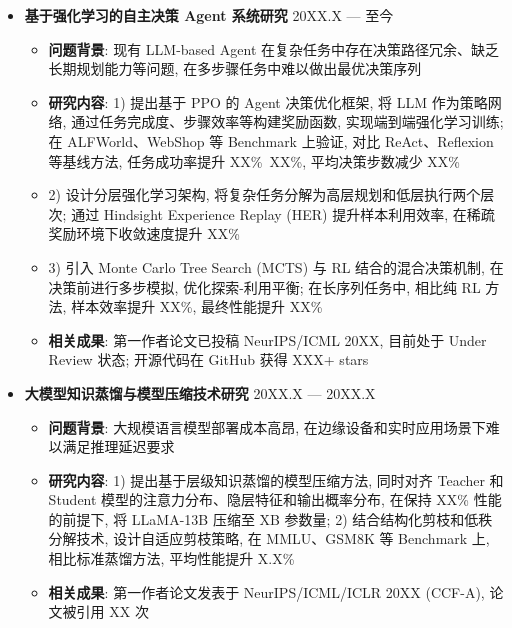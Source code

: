 \documentclass[zh]{resume}
\begin{document}
\begin{itemize}
    \item \textbf{基于强化学习的自主决策 Agent 系统研究} \hfill 20XX.X --- 至今
    \begin{itemize}
        \item \textbf{问题背景}: 现有 LLM-based Agent 在复杂任务中存在决策路径冗余、缺乏长期规划能力等问题, 在多步骤任务中难以做出最优决策序列
        \item \textbf{研究内容}: 1) 提出基于 PPO 的 Agent 决策优化框架, 将 LLM 作为策略网络, 通过任务完成度、步骤效率等构建奖励函数, 实现端到端强化学习训练; 在 ALFWorld、WebShop 等 Benchmark 上验证, 对比 ReAct、Reflexion 等基线方法, 任务成功率提升 XX\%~XX\%, 平均决策步数减少 XX\%
        \item 2) 设计分层强化学习架构, 将复杂任务分解为高层规划和低层执行两个层次; 通过 Hindsight Experience Replay (HER) 提升样本利用效率, 在稀疏奖励环境下收敛速度提升 XX\%
        \item 3) 引入 Monte Carlo Tree Search (MCTS) 与 RL 结合的混合决策机制, 在决策前进行多步模拟, 优化探索-利用平衡; 在长序列任务中, 相比纯 RL 方法, 样本效率提升 XX\%, 最终性能提升 XX\%
        \item \textbf{相关成果}: 第一作者论文已投稿 NeurIPS/ICML 20XX, 目前处于 Under Review 状态; 开源代码在 GitHub 获得 XXX+ stars
    \end{itemize}
    
    \item \textbf{大模型知识蒸馏与模型压缩技术研究} \hfill 20XX.X --- 20XX.X
    \begin{itemize}
        \item \textbf{问题背景}: 大规模语言模型部署成本高昂, 在边缘设备和实时应用场景下难以满足推理延迟要求
        \item \textbf{研究内容}: 1) 提出基于层级知识蒸馏的模型压缩方法, 同时对齐 Teacher 和 Student 模型的注意力分布、隐层特征和输出概率分布, 在保持 XX\% 性能的前提下, 将 LLaMA-13B 压缩至 XB 参数量; 2) 结合结构化剪枝和低秩分解技术, 设计自适应剪枝策略, 在 MMLU、GSM8K 等 Benchmark 上, 相比标准蒸馏方法, 平均性能提升 X.X\%
        \item \textbf{相关成果}: 第一作者论文发表于 NeurIPS/ICML/ICLR 20XX (CCF-A), 论文被引用 XX 次
    \end{itemize}
\end{itemize}
\end{document}
